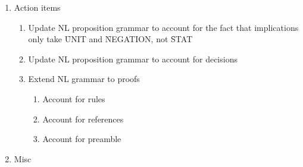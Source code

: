 \documentclass[a4paper]{article}
\begin{document}
\begin{enumerate}
  \item Action items
    \begin{enumerate}[\HollowBox]
      \item Update NL proposition grammar to account for the fact that
      implications only take \f{UNIT} and \f{NEGATION}, not \f{STAT}
      \item Update NL proposition grammar to account for decisions
      \item Extend NL grammar to proofs
        \begin{enumerate}[\HollowBox]
          \item Account for rules
          \item Account for references
          \item Account for preamble
        \end{enumerate}
    \end{enumerate}

  \item Misc

\end{enumerate}

\label{LastBody}
\end{document}

